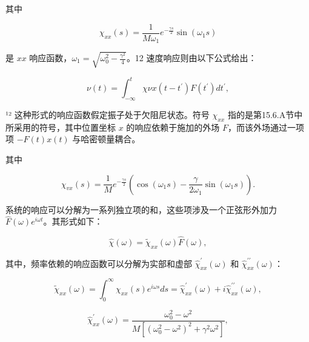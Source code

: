 其中

\begin{equation}\tag{15.3.37}\label{eq:15.3.37}
\chi _ { x x } ( s ) = \frac { 1 } { M \omega _ { 1 } } e ^{- \frac { \gamma s} { 2 } } \sin { ( \omega _ { 1 } s ) }
\end{equation}

是 \(xx\) 响应函数，\(\omega_{1}=\sqrt{\omega_{0}^{2}-\frac{\gamma^{2}}{4}}\)。12 速度响应则由以下公式给出：

\begin{equation}\tag{15.3.38}\label{eq:15.3.38}
\nu ( t ) = \int _ { - \infty } ^{t} \chi \nu x ( t - t ^{\prime} ) F ( t ^{\prime} ) d t ^{\prime} ,
\end{equation}

¹² 这种形式的响应函数假定振子处于欠阻尼状态。符号 \(\chi_{xx}\) 指的是第15.6.A节中所采用的符号，其中位置坐标 \(x\) 的响应依赖于施加的外场 \(F\)，而该外场通过一项项 \(-F(t)x(t)\) 与哈密顿量耦合。

其中

\begin{equation}\tag{15.3.39}\label{eq:15.3.39}
\chi _ { v x } ( s ) = \frac { 1 } { M } e ^{- \frac { \gamma s} { 2 } } \left( \cos ( \omega _ { 1 } s ) - \frac { \gamma } { 2 \omega _ { 1 } } \sin ( \omega _ { 1 } s ) \right) .
\end{equation}

系统的响应可以分解为一系列独立项的和，这些项涉及一个正弦形外加力 \(\hat{F}(\omega)e^{i\omega t}\)。其形式如下：

\begin{equation}\tag{15.3.40}\label{eq:15.3.40}
\hat { \chi } ( \omega ) = \tilde { \chi } _ { x x } ( \omega ) \hat { F } ( \omega ) ,
\end{equation}

其中，频率依赖的响应函数可以分解为实部和虚部 \(\hat{\chi}_{xx}^{\prime}(\omega)\) 和 \(\hat{\chi}_{xx}^{\prime\prime}(\omega)\)：

\begin{equation}\tag{15.3.41}\label{eq:15.3.41}
\tilde { \chi } _ { x x } ( \omega ) = \int _ { 0 } ^{\infty} \chi _ { x x } ( s ) e ^{i \omega s} d s = \hat { \chi } _ { x x } ^{\prime} ( \omega ) + i \hat { \chi } _ { x x } ^{\prime \prime} ( \omega ) ,
\end{equation}

\begin{equation}\tag{15.3.42}\label{eq:15.3.42}
\hat { \chi } _ { x x } ^{\prime} ( \omega ) = \frac { \omega _ { 0 } ^{2} - \omega ^{2} } { M [ ( \omega _ { 0 } ^{2} - \omega ^{2} ) ^{2} + \gamma ^{2} \omega ^{2} ] } ,
\end{equation}


